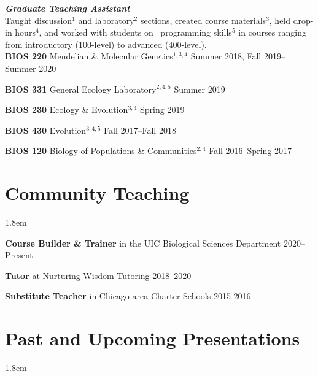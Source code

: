 \documentclass[]{article}
\begin{document}
\textit{\textbf{Graduate Teaching Assistant}}\\
Taught discussion$^{1}$ and laboratory$^{2}$ sections, created course materials$^{3}$, held drop-in hours$^{4}$, and worked with students on \textcolor{light-gray}{\faRProject}\ programming skills$^{5}$ in courses ranging from introductory (100-level) to advanced (400-level).\\

\textbf{BIOS 220} Mendelian \& Molecular Genetics$^{1, 3, 4}$ \href{https://ledelaney.org/teaching/genetics220/}{\faLink} \href{https://github.com/ledelaney/Genetics220}{\faGithub}
 \hfill Summer 2018, Fall 2019--Summer 2020


\textbf{BIOS 331} General Ecology Laboratory$^{2, 4, 5}$ \href{https://github.com/ledelaney/GeneralEcologyMaterials}{\faGithub} \hfill Summer 2019

     
\textbf{BIOS 230} Ecology \& Evolution$^{3, 4}$ \hfill Spring 2019
     
\textbf{BIOS 430} Evolution$^{3, 4, 5}$ \hfill Fall 2017--Fall 2018

\textbf{BIOS 120} Biology of Populations \& Communities$^{2, 4}$ \hfill Fall 2016--Spring 2017


\clearpage
\pagestyle{alldocument}

\section{Community Teaching}
\vspace{3mm}
\leftskip 1.8em

\textbf{Course Builder \& Trainer} in the UIC Biological Sciences Department \href{https://www.ledelaney.org/cb-materials}{\faLink} \href{https://github.com/ledelaney/cb-materials}{\faGithub} \hfill 2020--Present
     
\textbf{Tutor} at Nurturing Wisdom Tutoring \hfill 2018--2020

\textbf{Substitute Teacher} in Chicago-area Charter Schools \hfill 2015-2016

\vspace{2mm}
\section{Past and Upcoming Presentations}

\vspace{3mm}
\leftskip 1.8em
\end{document}

